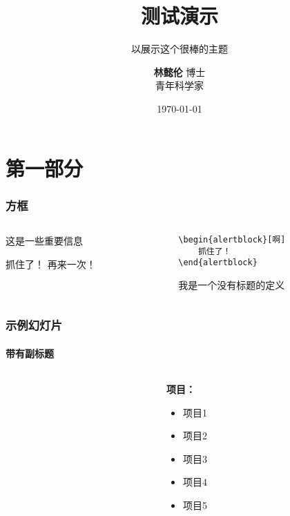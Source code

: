 \documentclass[aspectratio=169, usepdftitle=false, xcolor={dvipsnames}]{beamer}
\title{测试演示}
\author[上海人工智能实验室]{\textbf{林懿伦} \small{博士} \\ 青年科学家}
\subtitle{以展示这个很棒的主题}
\institute{城市计算中心}
\date{\today}
\begin{document}
\maketitle

\section{第一部分}
\begin{frame}[fragile]
	\frametitle{方框}
	\begin{columns}[t]
		\begin{column}{0.45\textwidth}
			\begin{block}[一些标题]
				这是一些重要信息
			\end{block}
			\begin{alertblock}[啊]
				抓住了！
				\tcblower
				再来一次！
			\end{alertblock}
		\end{column}
		\begin{column}{0.45\textwidth}
			\begin{examples}[例子1]
				\begin{verbatim}
\begin{alertblock}[啊]
	抓住了！
\end{alertblock}
				\end{verbatim}
			\end{examples}
			\begin{definition}
				我是一个没有标题的定义
			\end{definition}
		\end{column}
	\end{columns}
\end{frame}
\begin{frame}
	\frametitle[另一个标题]{示例幻灯片}
	\framesubtitle{带有副标题}
	\begin{columns}[t]
		\begin{column}{0.45\textwidth}
			\lipsum[1][1-5]
		\end{column}
		\begin{column}{0.45\textwidth}
			\textbf{项目：}
			\begin{itemize}
				\item 项目1
				\item 项目2
				\item 项目3
				\item 项目4
				\item 项目5
			\end{itemize}
		\end{column}
	\end{columns}
\end{frame}
\end{document}

